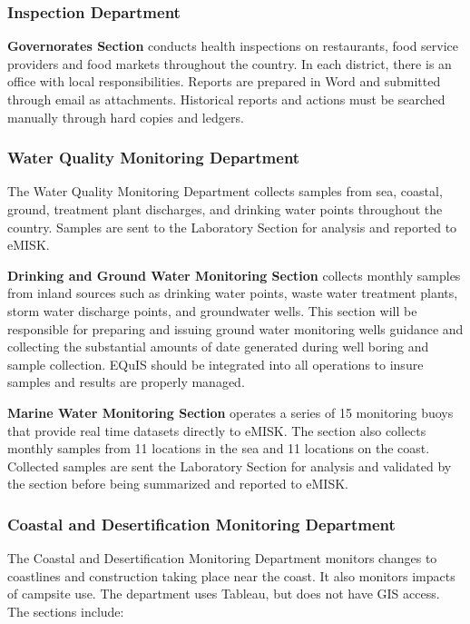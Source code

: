 \subsubsection{Inspection Department}

\textbf{Governorates Section} conducts health inspections on restaurants, food service providers and food markets throughout the country. In each district, there is an office with local responsibilities. Reports are prepared in Word and submitted through email as attachments. Historical reports and actions must be searched manually through hard copies and ledgers.

\subsubsection{Water Quality Monitoring Department}

The Water Quality Monitoring Department collects samples from sea, coastal, ground, treatment plant discharges, and drinking water points throughout the country. Samples are sent to the Laboratory Section for analysis and reported to eMISK.

\textbf{Drinking and Ground Water Monitoring Section} collects monthly samples from inland sources such as drinking water points, waste water treatment plants, storm water discharge points, and groundwater wells. This section will be responsible for preparing and issuing ground water monitoring wells guidance and collecting the substantial amounts of date generated during well boring and sample collection. EQuIS should be integrated into all operations to insure samples and results are properly managed.

\textbf{Marine Water Monitoring Section} operates a series of 15 monitoring buoys that provide real time datasets directly to eMISK. The section also collects monthly samples from 11 locations in the sea and 11 locations on the coast. Collected samples are sent the Laboratory Section for analysis and validated by the section before being summarized and reported to eMISK.

\subsubsection{Coastal and Desertification Monitoring Department}
The Coastal and Desertification Monitoring Department monitors changes to coastlines and construction taking place near the coast. It also monitors impacts of campsite use. The department uses Tableau, but does not have GIS access.  The sections include:

